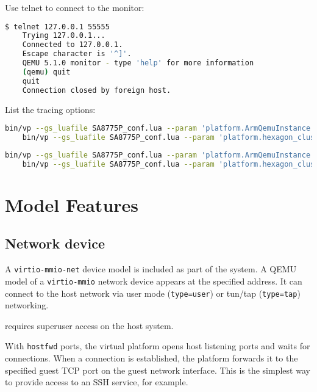 Use telnet to connect to the monitor:

\small
\begin{lstlisting}[language=bash]
    $ telnet 127.0.0.1 55555
    Trying 127.0.0.1...
    Connected to 127.0.0.1.
    Escape character is '^]'.
    QEMU 5.1.0 monitor - type 'help' for more information
    (qemu) quit
    quit
    Connection closed by foreign host.
\end{lstlisting}
\normalsize

List the tracing options:

\small
\begin{lstlisting}[language=bash]
    bin/vp --gs_luafile SA8775P_conf.lua --param 'platform.ArmQemuInstance.args.-d="help"'
    bin/vp --gs_luafile SA8775P_conf.lua --param 'platform.hexagon_cluster_0.HexagonQemuInstance.args.-d="help"'
\end{lstlisting}
\normalsize

\small
\begin{lstlisting}[language=bash]
    bin/vp --gs_luafile SA8775P_conf.lua --param 'platform.ArmQemuInstance.args.-d="trace:help"'
    bin/vp --gs_luafile SA8775P_conf.lua --param 'platform.hexagon_cluster_0.HexagonQemuInstance.args.-d="trace:help"'
\end{lstlisting}
\normalsize

\clearpage
\section{Model Features}

\subsection{Network device}

A {\small{\lstinline!virtio-mmio-net!}} device model is included as part of the system. A QEMU model of a {\small{\lstinline!virtio-mmio!}} network device appears at the specified address. It can connect to the host network via user mode ({\small{\lstinline!type=user!}}) or tun/tap ({\small{\lstinline!type=tap!}}) networking.

 requires superuser access on the host system.

With {\small{\lstinline!hostfwd!}} ports, the virtual platform opens host listening ports and waits for connections. When a connection is established, the platform forwards it to the specified guest TCP port on the guest network interface. This is the simplest way to provide access to an SSH service, for example.

